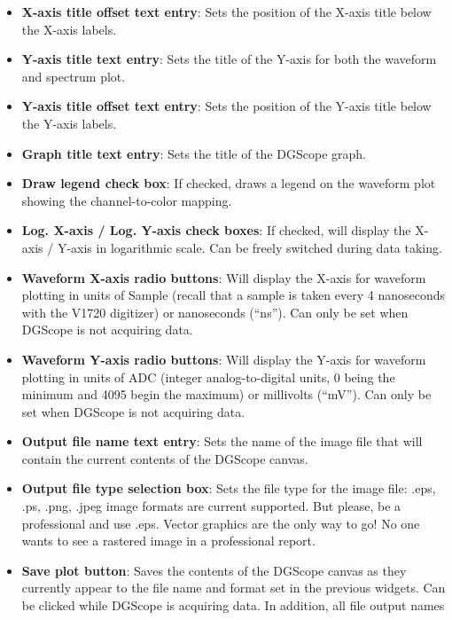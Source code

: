 \begin{itemize}
{\begin{itemize}
{        X-axis for both the waveform and spectrum plot.}
      \item{\textbf{X-axis title offset text entry}: Sets the position
        of the X-axis title below the X-axis labels.}
      \item{\textbf{Y-axis title text entry}: Sets the title of the
        Y-axis for both the waveform and spectrum plot.}
      \item{\textbf{Y-axis title offset text entry}: Sets the position
        of the Y-axis title below the Y-axis labels.}
      \item{\textbf{Graph title text entry}: Sets the title of the
        DGScope graph.}
      \item{\textbf{Draw legend check box}: If checked, draws a legend
        on the waveform plot showing the channel-to-color mapping.}
      \item{\textbf{Log. X-axis / Log. Y-axis check boxes}: If
        checked, will display the X-axis / Y-axis in logarithmic
        scale. Can be freely switched during data taking.}
      \item{\textbf{Waveform X-axis radio buttons}: Will display the
        X-axis for waveform plotting in units of Sample (recall that a
        sample is taken every 4 nanoseconds with the V1720 digitizer)
        or nanoseconds (``ns''). Can only be set when DGScope is not
        acquiring data.}
      \item{\textbf{Waveform Y-axis radio buttons}: Will display the
        Y-axis for waveform plotting in units of ADC (integer
        analog-to-digital units, 0 being the minimum and 4095 begin
        the maximum) or millivolts (``mV''). Can only be set when
        DGScope is not acquiring data.}
      \item{\textbf{Output file name text entry}: Sets the name of the
        image file that will contain the current contents of the
        DGScope canvas.}
      \item{\textbf{Output file type selection box}: Sets the file
        type for the image file: .eps, .ps, .png, .jpeg image formats
        are current supported. But please, be a professional and use
        .eps. Vector graphics are the only way to go! No one wants to
        see a rastered image in a professional report.}
      \item{\textbf{Save plot button}: Saves the contents of the
        DGScope canvas as they currently appear to the file name and
        format set in the previous widgets. Can be clicked while
        DGScope is acquiring data. In addition, all file output names
}
\end{itemize}}
\end{itemize}
